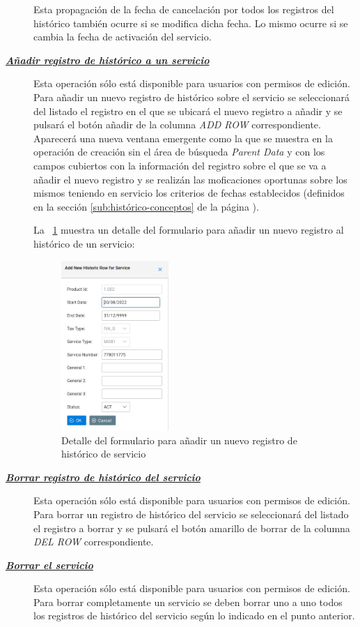 \begin{description}
Esta propagación de la fecha de cancelación por todos los registros del histórico  también ocurre si se modifica dicha fecha. Lo mismo ocurre si se cambia la fecha de activación del servicio.

\item[\underline{\textsl{\textbf{Añadir registro de histórico a un servicio}}}] Esta operación sólo está disponible para usuarios con permisos de edición.
Para añadir un nuevo registro de histórico sobre el servicio se seleccionará del listado el registro en el que se ubicará el nuevo registro a añadir y se pulsará el botón añadir de la columna \textit{ADD ROW} correspondiente. Aparecerá una nueva ventana emergente como la que se muestra en la operación de creación sin el área de búsqueda \emph{Parent Data} y con los campos cubiertos con la información del registro sobre el que se va a añadir el nuevo registro y se realizán las moficaciones oportunas sobre los mismos teniendo en servicio los criterios de fechas establecidos (definidos en la sección \ref{sub:histórico-conceptos} de la página \pageref{sub:histórico-conceptos}).

La \figurename~\ref{fig:nuevo-historico-servicio} muestra un detalle del formulario para añadir un nuevo registro al histórico de un servicio:

\begin{figure}[H]
  \centering
  \includegraphics[width=0.40\textwidth]{imaxes/nuevo-historico-servicio.png}
  \caption{Detalle del formulario para añadir un nuevo registro de histórico de servicio}
  \label{fig:nuevo-historico-servicio}
\end{figure}


\item[\underline{\textsl{\textbf{Borrar registro de histórico del servicio}}}] Esta operación sólo está disponible para usuarios con permisos de edición.
Para borrar un registro de histórico del servicio se seleccionará del listado el registro a borrar y se pulsará el botón amarillo de borrar de la columna \textit{DEL ROW} correspondiente.

\item[\underline{\textsl{\textbf{Borrar el servicio}}}] Esta operación sólo está disponible para usuarios con permisos de edición.
Para borrar completamente un servicio se deben borrar uno a uno todos los registros de histórico del servicio según lo indicado en el punto anterior. 
\end{description}


